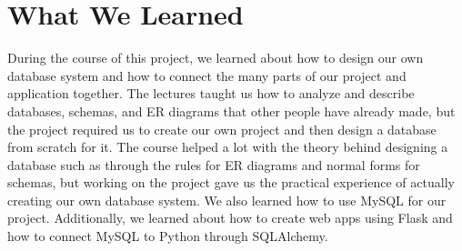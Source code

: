 \documentclass[12pt, oneside, a4paper]{article}
\begin{document}
    \section{What We Learned}
    During the course of this project, we learned about how to design our own database system and how to connect the many parts of our project and application together. The lectures taught us how to analyze and describe databases, schemas, and ER diagrams that other people have already made, but the project required us to create our own project and then design a database from scratch for it. The course helped a lot with the theory behind designing a database such as through the rules for ER diagrams and normal forms for schemas, but working on the project gave us the practical experience of actually creating our own database system. We also learned how to use MySQL for our project. Additionally, we learned about how to create web apps using Flask and how to connect MySQL to Python through SQLAlchemy.
\end{document}
